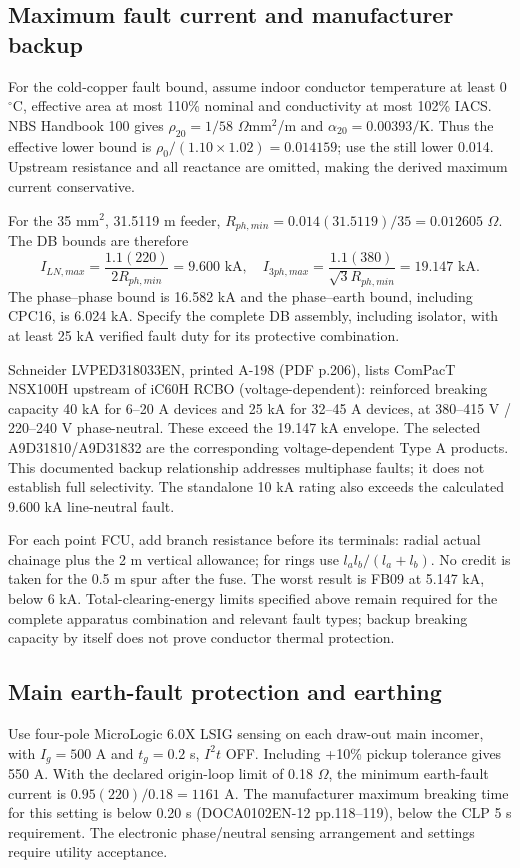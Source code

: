\subsection*{Maximum fault current and manufacturer backup}
For the cold-copper fault bound, assume indoor conductor temperature at least 0\,$^\circ$C, effective area at most 110\% nominal and conductivity at most 102\% IACS. NBS Handbook 100 gives $\rho_{20}=1/58$ $\Omega$mm$^2$/m and $\alpha_{20}=0.00393/\mathrm{K}$. Thus the effective lower bound is $\rho_0/(1.10\times1.02)=0.014159$; use the still lower 0.014. Upstream resistance and all reactance are omitted, making the derived maximum current conservative.

For the 35 mm$^2$, 31.5119 m feeder, $R_{ph,min}=0.014(31.5119)/35=0.012605$ $\Omega$. The DB bounds are therefore
\[
I_{LN,max}=\frac{1.1(220)}{2R_{ph,min}}=9.600\text{ kA},\quad
I_{3ph,max}=\frac{1.1(380)}{\sqrt3R_{ph,min}}=19.147\text{ kA}.
\]
The phase--phase bound is 16.582 kA and the phase--earth bound, including CPC16, is 6.024 kA. Specify the complete DB assembly, including isolator, with at least 25 kA verified fault duty for its protective combination.

Schneider LVPED318033EN, printed A-198 (PDF p.206), lists ComPacT NSX100H upstream of iC60H RCBO (voltage-dependent): reinforced breaking capacity 40 kA for 6--20 A devices and 25 kA for 32--45 A devices, at 380--415 V / 220--240 V phase-neutral. These exceed the 19.147 kA envelope. The selected A9D31810/A9D31832 are the corresponding voltage-dependent Type A products. This documented backup relationship addresses multiphase faults; it does not establish full selectivity. The standalone 10 kA rating also exceeds the calculated 9.600 kA line-neutral fault.

For each point FCU, add branch resistance before its terminals: radial actual chainage plus the 2 m vertical allowance; for rings use $l_a l_b/(l_a+l_b)$. No credit is taken for the 0.5 m spur after the fuse. The worst result is FB09 at 5.147 kA, below 6 kA. Total-clearing-energy limits specified above remain required for the complete apparatus combination and relevant fault types; backup breaking capacity by itself does not prove conductor thermal protection.

\subsection*{Main earth-fault protection and earthing}
Use four-pole MicroLogic 6.0X LSIG sensing on each draw-out main incomer, with $I_g=500$ A and $t_g=0.2$ s, $I^2t$ OFF. Including +10\% pickup tolerance gives 550 A. With the declared origin-loop limit of 0.18 $\Omega$, the minimum earth-fault current is $0.95(220)/0.18=1161$ A. The manufacturer maximum breaking time for this setting is below 0.20 s (DOCA0102EN-12 pp.118--119), below the CLP 5 s requirement. The electronic phase/neutral sensing arrangement and settings require utility acceptance.

